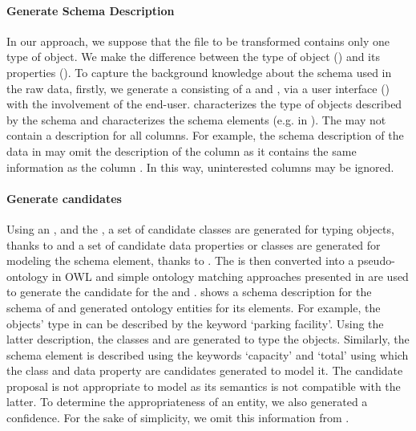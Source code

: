 \paragraph{Generate Schema Description}
In our approach, we suppose that the file to be transformed contains only one type of object. We make the difference between the type of object () and its properties (). To capture the background knowledge about the schema used in the raw data, firstly, we generate a  consisting of a  and  , via a user interface (\cf {}) with the involvement of the end-user.
 characterizes the type of objects described by the schema and  characterizes the schema elements (e.g.  in ). 
The  may not contain a description for all columns. For example, the schema description of the data in  may omit the description of the column  as it contains the same information as the column . In this way, uninterested columns may be ignored.


\paragraph{Generate candidates}
Using an , and the , a set of candidate classes are generated for typing objects, thanks to  and a set of candidate data properties or classes are generated for modeling the schema element, thanks to .
The  is then converted into a pseudo-ontology in OWL and simple ontology matching approaches presented in \cite{thieblin2019survey} are used to generate the candidate for the  and .
 shows a schema description for the schema of  and generated ontology entities for its elements. For example, the objects' type in  can be described by the keyword `parking facility'. Using the latter description, the classes  and  are generated to type the objects. Similarly, the schema element  is described using the keywords `capacity' and `total' using which the class  and data property  are candidates generated to model it. The candidate proposal  is not appropriate to model  as its semantics is not compatible with the latter. To determine the appropriateness of an entity, we also generated a confidence. For the sake of simplicity, we omit this information from .

